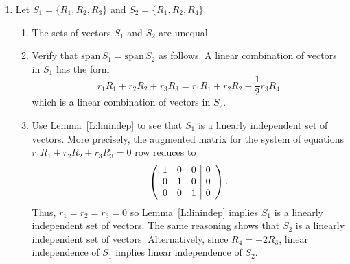 \documentclass{ximera}
\begin{document}
\begin{exercise}
\begin{solution}
\begin{enumerate}[label=(\alph*)]
\item Let $S_1=\{R_1,R_2,R_3\}$ and $S_2=\{R_1,R_2,R_4\}$.   
\begin{enumerate}
	\item The sets of vectors $S_1$ and $S_2$ are unequal.
	\item Verify that $\mathrm{span}\,S_1 = \mathrm{span}\,S_2$ as follows.  A linear combination of vectors in $S_1$ has the form
	\[
	r_1 R_1 + r_2 R_2 + r_3 R_3 = r_1 R_1 + r_2 R_2 - \frac{1}{2} r_3 R_4 
	\]
	which is a linear combination of vectors in $S_2$. 
	\item Use  Lemma~\ref{L:linindep} to see that $S_1$ is a linearly independent set of vectors. More precisely, the augmented matrix for the system of equations $r_1R_1+r_2 R_2+r_3 R_3=0$ row reduces to 
\[
\left(
\begin{array}{ccc|c}
 1 & 0 & 0 & 0 \\
 0 & 1 & 0& 0 \\
 0 & 0 & 1& 0 \\
\end{array}
\right)\ldotp
\]
Thus, $r_1 = r_2 = r_3 = 0$ so Lemma~\ref{L:linindep} implies $S_1$ is a linearly independent set of vectors. The same reasoning shows that $S_2$ is a linearly independent set of vectors.  Alternatively, since $R_4=-2R_3$, linear independence of $S_1$ implies linear independence of $S_2$.
\end{enumerate}
\end{enumerate}
\end{solution}
\end{exercise}
\end{document}
